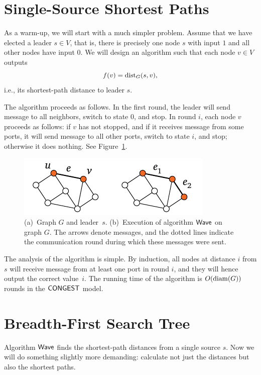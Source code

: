 \newcommand{\BFS}{\algo{BFS}}
\newcommand{\Wave}{\algo{Wave}}

\section{Single-Source Shortest Paths}\label{sec:wave}

As a warm-up, we will start with a much simpler problem. Assume that we have elected a leader $s \in V$, that is, there is precisely one node $s$ with input $1$ and all other nodes have input $0$. We will design an algorithm such that each node $v \in V$ outputs
\[
    f(v) = \operatorname{dist}_G(s,v),
\]
i.e., its shortest-path distance to leader $s$.

The algorithm proceeds as follows. In the first round, the leader will send message  to all neighbors, switch to state $0$, and stop. In round $i$, each node $v$ proceeds as follows: if $v$ has not stopped, and if it receives message  from some ports, it will send message  to all other ports, switch to state $i$, and stop; otherwise it does nothing. See Figure~\ref{fig:wave}.

\begin{figure}
    \centering
    \includegraphics[page=\PWave]{figs.pdf}
    \caption{(a)~Graph $G$ and leader~$s$. (b)~Execution of algorithm $\Wave$ on graph $G$. The arrows denote  messages, and the dotted lines indicate the communication round during which these messages were sent.}\label{fig:wave}
\end{figure}

The analysis of the algorithm is simple. By induction, all nodes at distance $i$ from $s$ will receive message  from at least one port in round $i$, and they will hence output the correct value~$i$. The running time of the algorithm is $O(\operatorname{diam}(G))$ rounds in the $\textup{\sffamily CONGEST}$ model.


\section{Breadth-First Search Tree}\label{sec:bfs}

Algorithm $\Wave$ finds the shortest-path distances from a single source $s$. Now we will do something slightly more demanding: calculate not just the distances but also the shortest paths.

